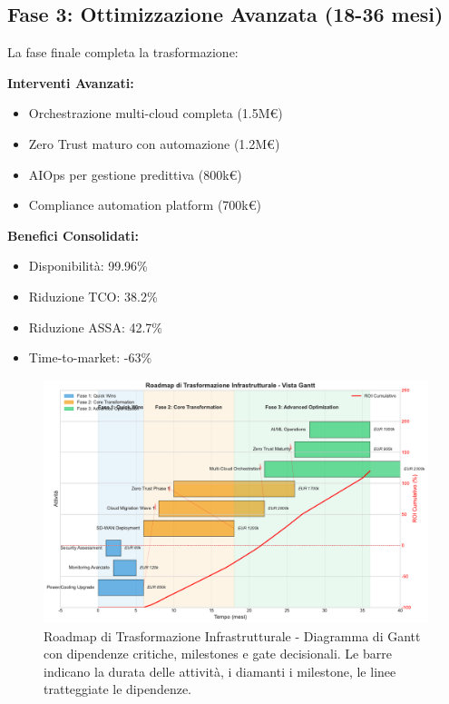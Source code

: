 \subsection{Fase 3: Ottimizzazione Avanzata (18-36 mesi)}

La fase finale completa la trasformazione:

\textbf{Interventi Avanzati:}
\begin{itemize}
    \item Orchestrazione multi-cloud completa (1.5M€)
    \item Zero Trust maturo con automazione (1.2M€)
    \item AIOps per gestione predittiva (800k€)
    \item Compliance automation platform (700k€)
\end{itemize}

\textbf{Benefici Consolidati:}
\begin{itemize}
    \item Disponibilità: 99.96\%
    \item Riduzione TCO: 38.2\%
    \item Riduzione ASSA: 42.7\%
    \item Time-to-market: -63\%
\end{itemize}

\begin{figure}[htbp]
\centering
\includegraphics[width=1\textwidth]{thesis_figures/cap3/figura_3_4_roadmap.pdf}
\caption{Roadmap di Trasformazione Infrastrutturale - Diagramma di Gantt con dipendenze critiche, milestones e gate decisionali. Le barre indicano la durata delle attività, i diamanti i milestone, le linee tratteggiate le dipendenze.}
\label{fig:roadmap_transformation}
\end{figure}

